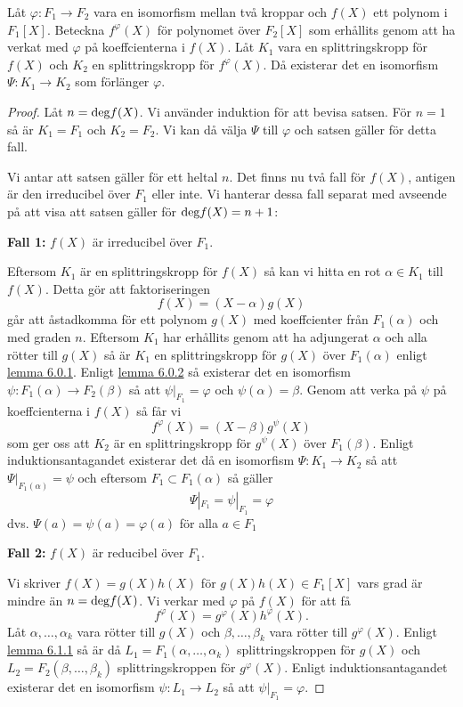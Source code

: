 \documentclass{article}
\newcommand{\grad}[0]{\textnormal{deg}}
\theoremstyle{definition}
\begin{document}
\hypertarget{sats6.0.1}{}
\begin{mytheo}{}{}
  Låt $\varphi: F_1 \rightarrow F_2$ vara en isomorfism mellan två kroppar och $f(X)$ ett polynom i $F_1[X]$. Beteckna 
  $f^{\varphi}(X)$ för polynomet över $F_2[X]$ som erhållits genom att ha verkat med $\varphi$ på koeffcienterna i $f(X)$. Låt 
  $K_1$ vara en splittringskropp för $f(X)$ och $K_2$ en splittringskropp för $f^{\varphi}(X).$ Då existerar det en isomorfism $\Psi: K_1 \rightarrow K_2$
  som förlänger $\varphi.$
\end{mytheo}

\begin{proof}
  Låt $n = \grad f(X)$. Vi använder induktion för att bevisa satsen. För $n = 1$ så är $K_1 = F_1$ och $K_2 = F_2$. Vi kan då välja 
  $\Psi$ till $\varphi$ och satsen gäller för detta fall. 

  Vi antar att satsen gäller för ett heltal $n$. Det finns nu två fall för $f(X)$, antigen är den irreducibel över $F_1$ eller inte. Vi hanterar dessa fall separat
  med avseende på att visa att satsen gäller för $\grad f(X) = n+1$:

  \textbf{Fall 1:} $f(X)$ är irreducibel över $F_1$. 

  Eftersom $K_1$ är en splittringskropp för $f(X)$ så kan vi hitta en rot $\alpha \in K_1$ till $f(X)$. Detta gör att faktoriseringen 
  \[f(X) = (X-\alpha)g(X)\]
  går att åstadkomma för ett polynom $g(X)$ med koeffcienter från $F_1(\alpha)$ och med graden $n$. Eftersom $K_1$ har erhållits genom att ha adjungerat $\alpha$ 
  och alla rötter till $g(X)$ så är $K_1$ en splittringskropp för $g(X)$ över $F_1(\alpha)$ enligt \hyperlink{lemma6.0.1}{lemma 6.0.1}.
  Enligt \hyperlink{6.0.2}{lemma 6.0.2} så existerar det en isomorfism 
  $\psi: F_1(\alpha) \rightarrow F_2(\beta)$ så att $\psi |_{F_1} = \varphi$ och $\psi(\alpha) = \beta.$ Genom att verka på $\psi$ på koeffcienterna i $f(X)$
  så får vi 
  \[f^{\varphi}(X) = (X - \beta)g^{\psi}(X)\]
  som ger oss att $K_2$ är en splittringskropp för $g^{\psi}(X)$ över $F_1(\beta)$. Enligt induktionsantagandet existerar det då en isomorfism $\Psi: K_1 \rightarrow K_2$
  så att $\Psi |_{F_1(\alpha)} = \psi$ och eftersom $F_1 \subset F_1(\alpha)$ så gäller 
  \[\Psi |_{F_1} = \psi |_{F_1} = \varphi\]
  dvs. $\Psi(a) = \psi(a) = \varphi(a)$ för alla $a \in F_1$

  \textbf{Fall 2:} $f(X)$ är reducibel över $F_1$.

Vi skriver $f(X) = g(X)h(X)$ för $g(X)h(X) \in F_1[X]$ vars grad är mindre än $n = \grad f(X)$. Vi verkar med $\varphi$ på $f(X)$ för att få 
\[f^{\varphi}(X) = g^{\varphi}(X)h^{\varphi}(X). \]
Låt $\alpha, \ldots, \alpha_k$ vara rötter till $g(X)$ och $\beta, \ldots, \beta_k$ vara rötter till $g^{\varphi}(X).$
Enligt \hyperlink{lemma6.0.1}{lemma 6.1.1} så är då $L_1 = F_1(\alpha, \ldots, \alpha_k)$ splittringskroppen för $g(X)$ och 
$L_2 = F_2(\beta, \ldots, \beta_k)$ splittringskroppen för $g^{\varphi}(X).$ Enligt induktionsantagandet existerar det en 
isomorfism $\psi: L_1 \rightarrow L_2$ så att $\psi |_{F_1} = \varphi.$


\end{proof}
\end{document}
